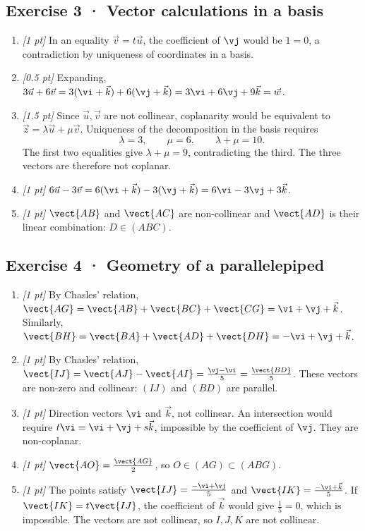 \subsection*{Exercise 3 · Vector calculations in a basis}\begin{enumerate}

\item \textit{[1 pt]} In an equality $\vec v=t\vec u$, the coefficient of $\vj $ would be $1=0$, a contradiction by uniqueness of coordinates in a basis.

\item \textit{[0.5 pt]} Expanding, $3\vec u+6\vec v=3(\vi +\vec k)+6(\vj +\vec k)=3\vi +6\vj +9\vec k=\vec w$.

\item \textit{[1.5 pt]} Since $\vec u,\vec v$ are not collinear, coplanarity would be equivalent to $\vec z=\lambda\vec u+\mu\vec v$. Uniqueness of the decomposition in the basis requires
\[\lambda=3,\qquad\mu=6,\qquad\lambda+\mu=10.\]
The first two equalities give $\lambda+\mu=9$, contradicting the third. The three vectors are therefore not coplanar.

\item \textit{[1 pt]} $6\vec u-3\vec v=6(\vi +\vec k)-3(\vj +\vec k)=6\vi -3\vj +3\vec k$.

\item \textit{[1 pt]} $\vect{AB}$ and $\vect{AC}$ are non-collinear and $\vect{AD}$ is their linear combination: $D\in(ABC)$.

\end{enumerate}

\subsection*{Exercise 4 · Geometry of a parallelepiped}\begin{enumerate}

\item \textit{[1 pt]} By Chasles' relation, $\vect{AG}=\vect{AB}+\vect{BC}+\vect{CG}=\vi +\vj +\vec k$. Similarly, $\vect{BH}=\vect{BA}+\vect{AD}+\vect{DH}=-\vi +\vj +\vec k$.

\item \textit{[1 pt]} By Chasles' relation, $\vect{IJ}=\vect{AJ}-\vect{AI}=\frac{\vj -\vi }{5}=\frac{\vect{BD}}{5}$. These vectors are non-zero and collinear: $(IJ)$ and $(BD)$ are parallel.

\item \textit{[1 pt]} Direction vectors $\vi $ and $\vec k$, not collinear. An intersection would require $t\vi =\vi +\vj +s\vec k$, impossible by the coefficient of $\vj $. They are non-coplanar.

\item \textit{[1 pt]} $\vect{AO}=\frac{\vect{AG}}{2}$, so $O\in(AG)\subset(ABG)$.

\item \textit{[1 pt]} The points satisfy $\vect{IJ}=\frac{-\vi +\vj }{5}$ and $\vect{IK}=\frac{-\vi +\vec k}{5}$. If $\vect{IK}=t\vect{IJ}$, the coefficient of $\vec k$ would give $\frac{1}{5}=0$, which is impossible. The vectors are not collinear, so $I,J,K$ are not collinear.

\end{enumerate}

\fi

\fi

